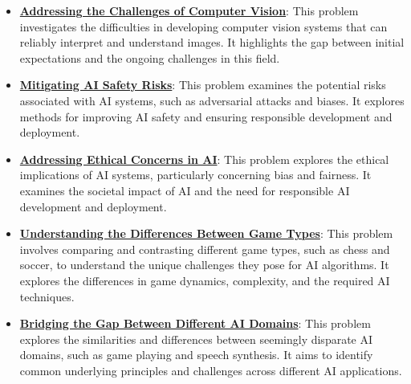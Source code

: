 \documentclass{article}%
\begin{document}
\begin{itemize}[leftmargin=*]
\item \href{https://purdue.brightspace.com/d2l/common/assets/pdfjs-d2l-dist/1.0.14-legacy/web/viewer.html?file=\%2Fcontent\%2Fenforced\%2F1095467-wl.202510.CS.24300.001\%2F02L2-Intro.pdf\%3Fou\%3D1095467\&lang=en-us\&container=d2l-fileviewer-rendered-pdf\&fullscreen=d2l-fileviewer-rendered-pdf-dialog\&height=667#page=15}{\textbf{Addressing the Challenges of Computer Vision}}: This problem investigates the difficulties in developing computer vision systems that can reliably interpret and understand images. It highlights the gap between initial expectations and the ongoing challenges in this field.%
\item \href{https://purdue.brightspace.com/d2l/common/assets/pdfjs-d2l-dist/1.0.14-legacy/web/viewer.html?file=\%2Fcontent\%2Fenforced\%2F1095467-wl.202510.CS.24300.001\%2F02L2-Intro.pdf\%3Fou\%3D1095467\&lang=en-us\&container=d2l-fileviewer-rendered-pdf\&fullscreen=d2l-fileviewer-rendered-pdf-dialog\&height=667#page=19}{\textbf{Mitigating AI Safety Risks}}: This problem examines the potential risks associated with AI systems, such as adversarial attacks and biases. It explores methods for improving AI safety and ensuring responsible development and deployment.%
\item \href{https://purdue.brightspace.com/d2l/common/assets/pdfjs-d2l-dist/1.0.14-legacy/web/viewer.html?file=\%2Fcontent\%2Fenforced\%2F1095467-wl.202510.CS.24300.001\%2F02L2-Intro.pdf\%3Fou\%3D1095467\&lang=en-us\&container=d2l-fileviewer-rendered-pdf\&fullscreen=d2l-fileviewer-rendered-pdf-dialog\&height=667#page=20}{\textbf{Addressing Ethical Concerns in AI}}: This problem explores the ethical implications of AI systems, particularly concerning bias and fairness. It examines the societal impact of AI and the need for responsible AI development and deployment.%
\item \href{https://purdue.brightspace.com/d2l/common/assets/pdfjs-d2l-dist/1.0.14-legacy/web/viewer.html?file=\%2Fcontent\%2Fenforced\%2F1095467-wl.202510.CS.24300.001\%2F02L2-Intro.pdf\%3Fou\%3D1095467\&lang=en-us\&container=d2l-fileviewer-rendered-pdf\&fullscreen=d2l-fileviewer-rendered-pdf-dialog\&height=667#page=27}{\textbf{Understanding the Differences Between Game Types}}: This problem involves comparing and contrasting different game types, such as chess and soccer, to understand the unique challenges they pose for AI algorithms. It explores the differences in game dynamics, complexity, and the required AI techniques.%
\item \href{https://purdue.brightspace.com/d2l/common/assets/pdfjs-d2l-dist/1.0.14-legacy/web/viewer.html?file=\%2Fcontent\%2Fenforced\%2F1095467-wl.202510.CS.24300.001\%2F02L2-Intro.pdf\%3Fou\%3D1095467\&lang=en-us\&container=d2l-fileviewer-rendered-pdf\&fullscreen=d2l-fileviewer-rendered-pdf-dialog\&height=667#page=31}{\textbf{Bridging the Gap Between Different AI Domains}}: This problem explores the similarities and differences between seemingly disparate AI domains, such as game playing and speech synthesis. It aims to identify common underlying principles and challenges across different AI applications.%

\end{itemize}
\end{document}
